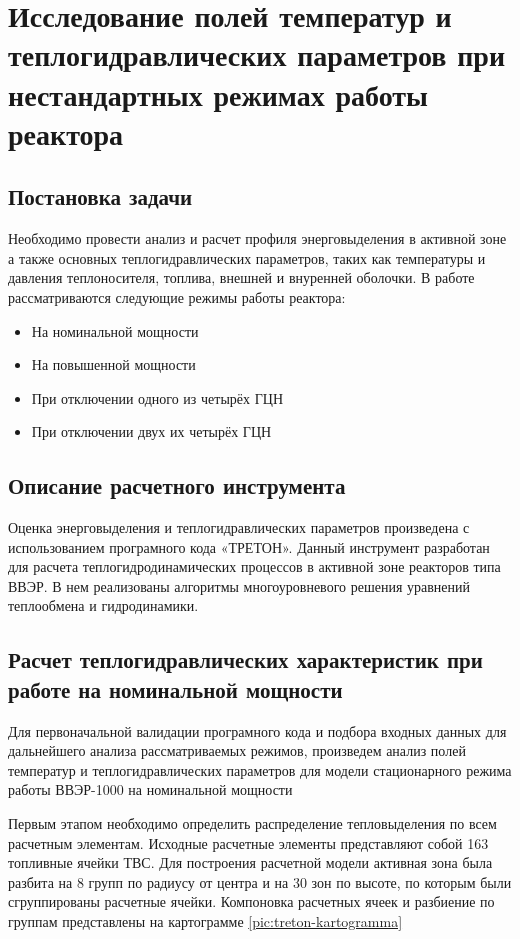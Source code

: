 \section{Исследование полей температур и теплогидравлических параметров при нестандартных режимах работы реактора}

\subsection{Постановка задачи}
Необходимо провести анализ и расчет профиля энерговыделения в активной зоне а также основных теплогидравлических параметров, таких как температуры и давления теплоносителя, топлива, внешней и внуренней оболочки. В работе рассматриваются следующие режимы работы реактора:
\begin{itemize}
    \item На номинальной мощности
    \item На повышенной мощности
    \item При отключении одного из четырёх ГЦН
    \item При отключении двух их четырёх ГЦН
\end{itemize}

\subsection{Описание расчетного инструмента}
Оценка энерговыделения и теплогидравлических параметров произведена с использованием програмного кода «ТРЕТОН». Данный инструмент разработан для расчета теплогидродинамических процессов в активной зоне реакторов типа ВВЭР. В нем реализованы алгоритмы многоуровневого решения уравнений теплообмена и гидродинамики.


\subsection{Расчет теплогидравлических характеристик при работе на номинальной мощности}
Для первоначальной валидации програмного кода и подбора входных данных для дальнейшего анализа рассматриваемых режимов, произведем анализ полей температур и теплогидравлических параметров для модели стационарного режима работы ВВЭР-1000 на номинальной мощности

Первым этапом необходимо определить распределение тепловыделения по всем расчетным элементам. Исходные расчетные элементы представляют собой 163 топливные ячейки ТВС. Для построения расчетной модели активная зона была разбита на 8 групп по радиусу от центра и на 30 зон по высоте, по которым были сгруппированы расчетные ячейки. Компоновка расчетных ячеек и разбиение по группам представлены на картограмме \ref{pic:treton-kartogramma}


